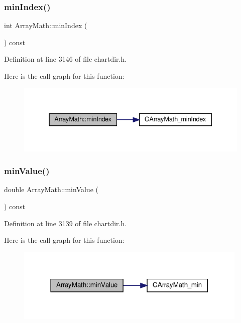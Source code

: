 \subsubsection{\texorpdfstring{min\+Index()}{minIndex()}}
{\footnotesize\ttfamily int Array\+Math\+::min\+Index (\begin{DoxyParamCaption}{ }\end{DoxyParamCaption}) const\hspace{0.3cm}{\ttfamily [inline]}}



Definition at line 3146 of file chartdir.\+h.

Here is the call graph for this function\+:
\nopagebreak
\begin{figure}[H]
\begin{center}
\leavevmode
\includegraphics[width=337pt]{class_array_math_a0cf1a69edacfb547184b06e6c71693e6_cgraph}
\end{center}
\end{figure}
\mbox{\label{class_array_math_aff26b5d31ec9ec6f7e113a6425ca4e13}} 
\subsubsection{\texorpdfstring{min\+Value()}{minValue()}}
{\footnotesize\ttfamily double Array\+Math\+::min\+Value (\begin{DoxyParamCaption}{ }\end{DoxyParamCaption}) const\hspace{0.3cm}{\ttfamily [inline]}}



Definition at line 3139 of file chartdir.\+h.

Here is the call graph for this function\+:
\nopagebreak
\begin{figure}[H]
\begin{center}
\leavevmode
\includegraphics[width=314pt]{class_array_math_aff26b5d31ec9ec6f7e113a6425ca4e13_cgraph}
\end{center}
\end{figure}
\mbox{\label{class_array_math_abaaac1009dda4a6124ecd2182354dc39}} 
